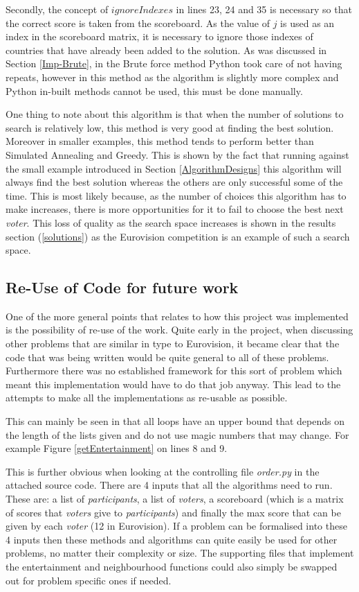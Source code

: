 \documentclass[12pt]{report}
\begin{document}
Secondly, the concept of $ignoreIndexes$ in lines 23, 24 and 35 is necessary so that the correct score is taken from the scoreboard. As the value of $j$ is used as an index in the scoreboard matrix, it is necessary to ignore those indexes of countries that have already been added to the solution. As was discussed in Section \ref{Imp-Brute}, in the Brute force method Python took care of not having repeats, however in this method as the algorithm is slightly more complex and Python in-built methods cannot be used, this must be done manually.

One thing to note about this algorithm is that when the number of solutions to search is relatively low, this method is very good at finding the best solution. Moreover in smaller examples, this method tends to perform better than Simulated Annealing and Greedy. This is shown by the fact that running against the small example introduced in Section \ref{AlgorithmDesigns} this algorithm will always find the best solution whereas the others are only successful some of the time. This is most likely because, as the number of choices this algorithm has to make increases, there is more opportunities for it to fail to choose the best next \textit{voter}. This loss of quality as the search space increases is shown in the results section (\ref{solutions}) as the Eurovision competition is an example of such a search space.

\subsection{Re-Use of Code for future work}\label{Imp-Reuse}
One of the more general points that relates to how this project was implemented is the possibility of re-use of the work. Quite early in the project, when discussing other problems that are similar in type to Eurovision, it became clear that the code that was being written would be quite general to all of these problems. Furthermore there was no established framework for this sort of problem which meant this implementation would have to do that job anyway. This lead to the attempts to make all the implementations as re-usable as possible.

This can mainly be seen in that all loops have an upper bound that depends on the length of the lists given and do not use magic numbers that may change. For example Figure \ref{getEntertainment} on lines 8 and 9. 

This is further obvious when looking at the controlling file \textit{order.py} in the attached source code. There are 4 inputs that all the algorithms need to run. These are: a list of \textit{participants}, a list of \textit{voters}, a scoreboard (which is a matrix of scores that \textit{voters} give to \textit{participants}) and finally the max score that can be given by each \textit{voter} (12 in Eurovision). If a problem can be formalised into these 4 inputs then these methods and algorithms can quite easily be used for other problems, no matter their complexity or size. The supporting files that implement the entertainment and neighbourhood functions could also simply be swapped out for problem specific ones if needed.
\end{document}
